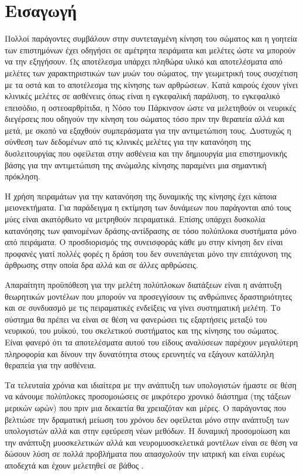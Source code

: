 \chapter{Εισαγωγή}

Πολλοί παράγοντες συμβάλουν στην συντεταγμένη κίνηση του σώματος και η γοητεία των επιστημόνων έχει οδηγήσει σε αμέτρητα πειράματα και μελέτες ώστε να μπορούν να την εξηγήσουν. Ως αποτέλεσμα υπάρχει πληθώρα υλικό και αποτελέσματα από μελέτες των χαρακτηριστικών των μυών του σώματος, την γεωμετρική τους συσχέτιση με τα οστά και το αποτέλεσμα της κίνησης των αρθρώσεων. Κατά καιρούς έχουν γίνει κλινικές μελέτες σε ασθένειες όπως είναι η εγκεφαλική παράλυση, το εγκεφαλικό επεισόδιο, η οστεοαρθρίτιδα, η Νόσο του Πάρκινσον ώστε να μελετηθούν οι νευρικές διεγέρσεις που οδηγούν την κίνηση του σώματος τόσο πριν την θεραπεία αλλά και μετά, με σκοπό να εξαχθούν συμπεράσματα για την αντιμετώπιση τους. Δυστυχώς η σύνθεση των δεδομένων από τις κλινικές μελέτες για την κατανόηση της δυσλειτουργίας που οφείλεται στην ασθένεια και την δημιουργία μια επιστημονικής βάσης για την αντιμετώπιση της ανώμαλης κίνησης παραμένει μια σημαντική πρόκληση.

Η χρήση πειραμάτων για την κατανόηση της δυναμικής της κίνησης έχει κάποια μειονεκτήματα. Για παράδειγμα η εκτίμηση των δυνάμεων που παράγονται από τους μύες είναι ακατόρθωτο να μετρηθούν πειραματικά. Επίσης υπάρχει δυσκολία κατανόησης των φαινομένων δράσης-αντίδρασης σε τόσο πολύπλοκα συστήματα μόνο από πειράματα. Ο προσδιορισμός της συνεισφοράς κάθε μυ στην κίνηση δεν είναι προφανές γιατί πολλές φορές η δράση του δεν συνεπάγεται μόνο την επιτάχυνση της άρθρωσης στην οποία δρα \cite{zajac-gordon89} αλλά και σε άλλες αρθρώσεις.

Απαραίτητη προϋπόθεση για την μελέτη πολύπλοκων διατάξεων είναι η ανάπτυξη θεωρητικών μοντέλων που μπορούν να προσεγγίσουν τις ανθρώπινες δραστηριότητες και σε συνδυασμό με τις πειραματικές ενδείξεις να γίνει συστηματική μελέτη. Το σύστημα θα πρέπει να είναι σε θέση να φανερώσει τις εξαρτήσεις μεταξύ του νευρικού, του μυϊκού, του σκελετικού συστήματος και της κίνησης του σώματος. Είναι φανερό ότι τα αποτελέσματα αυτού του είδους αναλύσεων παρέχουν μεγαλύτερη πληροφορία και δίνουν την δυνατότητα στους ερευνητές να εξάγουν κατάλληλη θεραπεία για την ασθένεια.

Τα τελευταία χρόνια και ιδιαίτερα με την ανάπτυξη των υπολογιστών ήμαστε σε θέση να κάνουμε πολύπλοκες προσομοιώσεις σε μικρότερο χρονικό διάστημα (της τάξεων μερικών ωρών) που πριν μια δεκαετία θα χρειαζόταν και μέρες. Ο παράγοντας που βελτιώσε την δραματική μείωση του χρόνου δεν οφείλεται μόνο στην ανάπτυξη των υπολογιστών αλλά και στην εφεύρεση νέων μεθόδων. Η δυναμική προσομοίωση και την ανάπτυξη μυοσκελετικών αλλά και νευρομυοσκελετικά μοντέλων είναι σε θέση να δώσουν λύση σε πολλά προβλήματα που απασχολούν την ιατρική και είναι ευρέως αποδεχτά και έχουν μελετηθεί σε βάθος \cite{thelen-chumanov06, piazza06, pandy01, zajac02}.

